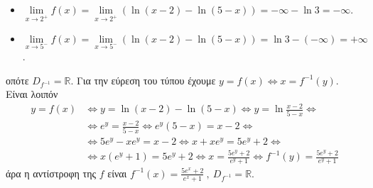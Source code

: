 \documentclass[a4paper,11pt,twoside]{article}
\begin{document}
\begin{itemize}
\item $\lim\limits_{x\to2^+}{f(x)}=\lim\limits_{x\to2^+}{\left(\ln{(x-2)}-\ln{(5-x)}\right)}=-\infty-\ln{3}=-\infty$.
\item $\lim\limits_{x\to5^-}{f(x)}=\lim\limits_{x\to5^-}{\left(\ln{(x-2)}-\ln{(5-x)}\right)}=\ln{3}-(-\infty)=+\infty$.
\end{itemize}
οπότε $D_{f^{-1}}=\mathbb{R}$. Για την εύρεση του τύπου έχουμε $y=f(x)\Leftrightarrow x=f^{-1}(y)$. Είναι λοιπόν
\begin{align*}
y=f(x)&\Leftrightarrow y=\ln{(x-2)}-\ln{(5-x)}\Leftrightarrow y=\ln{\frac{x-2}{5-x}}\Leftrightarrow\\
&\Leftrightarrow e^y=\frac{x-2}{5-x}\Leftrightarrow e^y(5-x)=x-2\Leftrightarrow\\
&\Leftrightarrow 5e^y-xe^y=x-2\Leftrightarrow x+xe^y=5e^y+2\Leftrightarrow\\
&\Leftrightarrow x\left(e^y+1\right)=5e^y+2\Leftrightarrow x=\frac{5e^y+2}{e^y+1}\Leftrightarrow f^{-1}(y)=\frac{5e^y+2}{e^y+1}
\end{align*}
άρα η αντίστροφη της $f$ είναι $f^{-1}(x)=\frac{5e^x+2}{e^x+1}\ ,\ D_{f^{-1}}=\mathbb{R}$.
\end{document}
